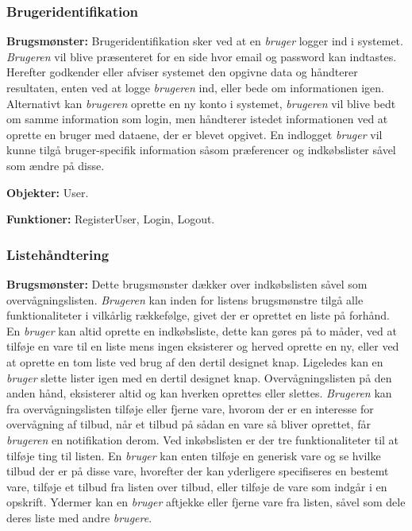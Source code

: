 \subsubsection*{Brugeridentifikation}
\textbf{Brugsmønster:} Brugeridentifikation sker ved at en \textit{bruger} logger ind i systemet. 
\textit{Brugeren} vil blive præsenteret for en side hvor email og password kan indtastes.
Herefter godkender eller afviser systemet den opgivne data og håndterer resultaten, enten ved at logge \textit{brugeren} ind, eller bede om informationen igen.
Alternativt kan \textit{brugeren} oprette en ny konto i systemet, \textit{brugeren} vil blive bedt om samme information som login, men håndterer istedet informationen ved at oprette en bruger med dataene, der er blevet opgivet.
En indlogget \textit{bruger} vil kunne tilgå bruger-specifik information såsom præferencer og indkøbslister såvel som ændre på disse.

\textbf{Objekter:} User.

\textbf{Funktioner:} RegisterUser, Login, Logout.

\subsubsection*{Listehåndtering}
\textbf{Brugsmønster:} Dette brugsmønster dækker over indkøbslisten såvel som overvågningslisten. 
\textit{Brugeren} kan inden for listens brugsmønstre tilgå alle funktionaliteter i vilkårlig rækkefølge, givet der er oprettet en liste på forhånd. 
En \textit{bruger} kan altid oprette en indkøbsliste, dette kan gøres på to måder, ved at tilføje en vare til en liste mens ingen eksisterer og herved oprette en ny, eller ved at oprette en tom liste ved brug af den dertil designet knap.
Ligeledes kan en \textit{bruger} slette lister igen med en dertil designet knap.
Overvågningslisten på den anden hånd, eksisterer altid og kan hverken oprettes eller slettes.
\textit{Brugeren} kan fra overvågningslisten tilføje eller fjerne vare, hvorom der er en interesse for overvågning af tilbud, når et tilbud på sådan en vare så bliver oprettet, får \textit{brugeren} en notifikation derom.
Ved inkøbslisten er der tre funktionaliteter til at tilføje ting til listen.
En \textit{bruger} kan enten tilføje en generisk vare og se hvilke tilbud der er på disse vare, hvorefter der kan yderligere specifiseres en bestemt vare, tilføje et tilbud fra listen over tilbud, eller tilføje de vare som indgår i en opskrift.
Ydermer kan en \textit{bruger} aftjekke eller fjerne vare fra listen, såvel som dele deres liste med andre \textit{brugere}.


